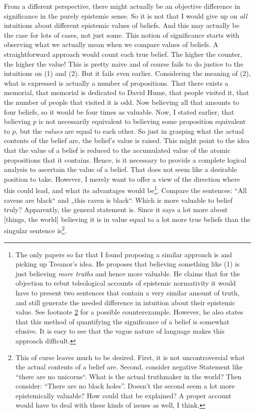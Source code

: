 \documentclass[12pt,numbers=noenddot]{scrartcl}
\begin{document}
From a different perspective, there might actually be an objective difference in significance in the purely epistemic sense. So it is not that I would give up on \emph{all} intuitions about different epistemic values of beliefs. And this may actually be the case for lots of cases, not just some. This notion of significance starts with observing what we actually mean when we compare values of beliefs. A straightforward approach would count each true belief. The higher the counter, the higher the value! This is pretty naive and of course fails to do justice to the intuitions on (1) and (2). But it fails even earlier. Considering the meaning of (2), what is expressed is actually a number of propositions. That there exists a memorial, that memorial is dedicated to David Hume, that people visited it, that the number of people that visited it is odd. Now believing all that amounts to four beliefs, so it would be four times as valuable. Now, I stated earlier, that believing $p$ is not necessarily equivalent to believing some proposition equivalent to $p$, but the \emph{values} are equal to each other. So just in grasping what the actual contents of the belief are, the belief's value is raised. This might point to the idea that the value of a belief is reduced to the accumulated value of the atomic propositions that it contains. Hence, is it necessary to provide a complete logical analysis to ascertain the value of a belief. That does not seem like a desirable position to take. However, I merely want to offer a view of the direction where this could lead, and what its advantages would be\footnote{The only papers so far that I found proposing a similar approach is \textcite{Treanor2014-TRETTA} and \textcite{Pritchard2014} picking up Treanor's idea. He proposes that believing something like (1) is just believing \emph{more truths} and hence more valuable. He claims that for the objection to rebut teleological accounts of epistemic normativity it would have to present two sentences that contain a very similar amount of truth, and still generate the needed difference in intuition about their epistemic value. See footnote \ref{foot:noblackholes} for a possible counterexample. However, he also states that this method of quantifying the significance of a belief is somewhat elusive. It is easy to see that the vague nature of language makes this approach difficult.}.
Compare the sentences: “All ravens are black“ and „this raven is black“. Which is more valuable to belief truly? Apparently, the general statement is. Since it says a lot more about [things, the world] believing it  is in value equal to a lot more true beliefs than the singular sentence is\footnote{\label{foot:noblackholes}This of curse leaves much to be desired. First, it is not uncontroversial what the actual contents of a belief are. Second, consider negative Statement like “there are no unicorns“. What is the actual truthmaker in the world? Then consider: “There are no black holes”. Doesn't the second seem a lot more epistemically valuable? How could that be explained? A proper account would have to deal with these kinds of issues as well, I think.}.
\end{document}
